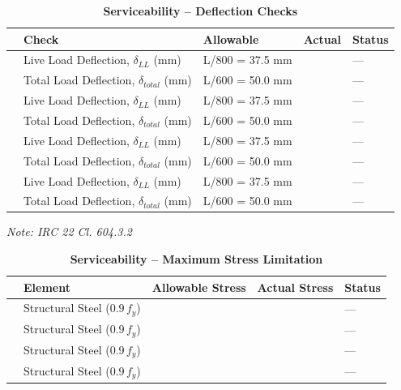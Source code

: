 \documentclass[12pt,a4paper]{report}
\numberwithin{table}{chapter}
\numberwithin{figure}{chapter}
\begin{document}
\vspace{1em}
\begin{longtable}{|C{2.5cm}|L{3.5cm}|C{3.5cm}|>{\centering\arraybackslash}p{3.5cm}|C{2.5cm}|}
\caption{\textbf{Serviceability -- Deflection Checks}}
\hline
\textbf{} & \textbf{Check} & \textbf{Allowable} & \textbf{Actual} & \textbf{Status} \\[6pt]
\hline
{} & Live Load Deflection, $\delta_{LL}$ (mm) & L/800 = 37.5 mm &  & --- \\[6pt]
 & Total Load Deflection, $\delta_{total}$ (mm) & L/600 = 50.0 mm &  & --- \\[6pt]
\hline
{} & Live Load Deflection, $\delta_{LL}$ (mm) & L/800 = 37.5 mm &  & --- \\[6pt]
 & Total Load Deflection, $\delta_{total}$ (mm) & L/600 = 50.0 mm &  & --- \\[6pt]
\hline
{} & Live Load Deflection, $\delta_{LL}$ (mm) & L/800 = 37.5 mm &  & --- \\[6pt]
 & Total Load Deflection, $\delta_{total}$ (mm) & L/600 = 50.0 mm &  & --- \\[6pt]
\hline
{} & Live Load Deflection, $\delta_{LL}$ (mm) & L/800 = 37.5 mm &  & --- \\[6pt]
 & Total Load Deflection, $\delta_{total}$ (mm) & L/600 = 50.0 mm &  & --- \\[6pt]
\hline
\end{longtable}
\noindent\textit{Note: IRC 22 Cl. 604.3.2}

\vspace{1em}
\begin{longtable}{|C{2.5cm}|L{3.5cm}|C{3.5cm}|>{\centering\arraybackslash}p{3.5cm}|C{2.5cm}|}
\caption{\textbf{Serviceability -- Maximum Stress Limitation}}
\hline
\textbf{} & \textbf{Element} & \textbf{Allowable Stress} & \textbf{Actual Stress} & \textbf{Status} \\[6pt]
\hline
\makecell{} & Structural Steel ($0.9\,f_y$) &  &  & --- \\[6pt]
\hline
\makecell{} & Structural Steel ($0.9\,f_y$) &  &  & --- \\[6pt]
\hline
\makecell{} & Structural Steel ($0.9\,f_y$) &  &  & --- \\[6pt]
\hline
\makecell{} & Structural Steel ($0.9\,f_y$) &  &  & --- \\[6pt]
\hline
\end{longtable}
\end{document}
